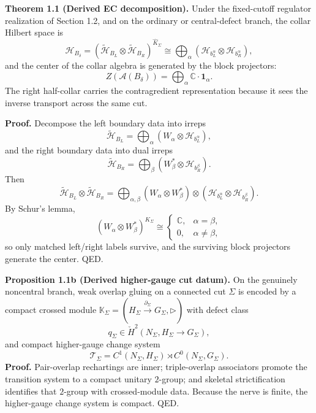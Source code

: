 \textbf{Theorem 1.1 (Derived EC decomposition).} Under the fixed-cutoff regulator realization of Section 1.2, and on the ordinary or central-defect branch, the collar Hilbert space is
\[
\mathcal H_{B_\delta}
=
(\tilde{\mathcal H}_{B_L}\otimes \tilde{\mathcal H}_{B_R})^{\widehat K_\Sigma}
\cong
\bigoplus_{\alpha}
\left(\mathcal H_{b_L^\alpha}\otimes \mathcal H_{b_R^\alpha}\right),
\]
and the center of the collar algebra is generated by the block projectors:
\[
Z(\mathcal A(B_\delta))
=
\bigoplus_\alpha \mathbb C\cdot \mathbf 1_\alpha.
\]
The right half-collar carries the contragredient representation because it sees the inverse transport across the same cut.

\textbf{Proof.} Decompose the left boundary data into irreps
\[
\tilde{\mathcal H}_{B_L}
=
\bigoplus_\alpha
\left(W_\alpha\otimes \mathcal H_{b_L^\alpha}\right),
\]
and the right boundary data into dual irreps
\[
\tilde{\mathcal H}_{B_R}
=
\bigoplus_\beta
\left(W_\beta^*\otimes \mathcal H_{b_R^\beta}\right).
\]
Then
\[
\tilde{\mathcal H}_{B_L}\otimes \tilde{\mathcal H}_{B_R}
=
\bigoplus_{\alpha,\beta}
(W_\alpha\otimes W_\beta^*)\otimes
(\mathcal H_{b_L^\alpha}\otimes \mathcal H_{b_R^\beta}).
\]
By Schur's lemma,
\[
(W_\alpha\otimes W_\beta^*)^{\widehat K_\Sigma}
\cong
\begin{cases}
\mathbb C, & \alpha=\beta,\\
0, & \alpha\neq \beta,
\end{cases}
\]
so only matched left/right labels survive, and the surviving block projectors generate the center. QED.

\textbf{Proposition 1.1b (Derived higher-gauge cut datum).} On the genuinely noncentral branch, weak overlap gluing on a connected cut \(\Sigma\) is encoded by a compact crossed module \(\mathbb K_\Sigma=(H_\Sigma\xrightarrow{\partial_\Sigma}G_\Sigma,\triangleright)\) with defect class
\[
q_\Sigma\in \check H^2(N_\Sigma,H_\Sigma\to G_\Sigma),
\]
and compact higher-gauge change system
\[
\mathcal T_\Sigma=C^1(N_\Sigma,H_\Sigma)\rtimes C^0(N_\Sigma,G_\Sigma).
\]
\textbf{Proof.} Pair-overlap rechartings are inner; triple-overlap associators promote the transition system to a compact unitary \(2\)-group; and skeletal strictification identifies that \(2\)-group with crossed-module data. Because the nerve is finite, the higher-gauge change system is compact. QED.


